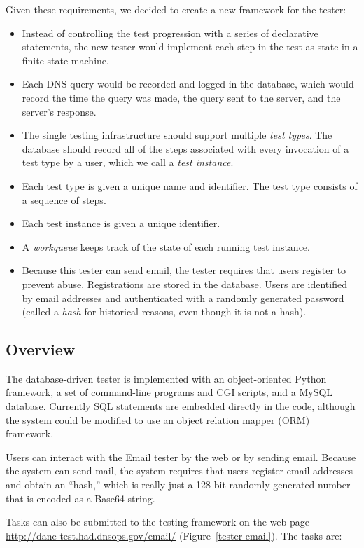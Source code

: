 \documentclass[preprint,3p,11pt]{elsarticle}
\begin{document}
\noindent Given these requirements, we decided to create a new framework for the
tester:

\begin{itemize}
\item Instead of controlling the test progression with a series of
  declarative statements, the new tester would implement each
  step in the test as state in a finite state machine. 
\item Each DNS query would be recorded and logged in the database,
  which would record the time the query was made, the query sent to
  the server, and the server's response. 
\item The single testing infrastructure should support multiple \emph{test
  types}. The database should record all of the steps associated with
  every invocation of a test type by a user, which we call a
  \emph{test instance}.
\item Each test type is given a unique name and identifier. The test type
  consists of a sequence of steps.
\item Each test instance is given a unique identifier. 
\item A \emph{workqueue} keeps track of the state of each running test instance.
\item Because this tester can send email, the tester requires that
  users register to prevent abuse. Registrations are stored in the
  database. Users are identified by email addresses and authenticated
  with a randomly generated password (called a \emph{hash} for
  historical reasons, even though it is not a hash). 
\end{itemize}

\subsection{Overview}
The database-driven tester is implemented with an object-oriented
Python framework, a set of command-line programs and CGI scripts, and
a MySQL database. Currently SQL statements are embedded directly in
the code, although the system could be modified to use an object
relation mapper (ORM) framework. 

Users can interact with the Email tester by the web or by sending
email. Because the system can send mail, the system requires that
users register email addresses and obtain an ``hash,'' which is
really just a 128-bit randomly generated number that is encoded as a
Base64 string.

Tasks can also be submitted to the testing framework on the web page
\url{http://dane-test.had.dnsops.gov/email/}
(Figure~\ref{tester-email}). The tasks are:
\end{document}

